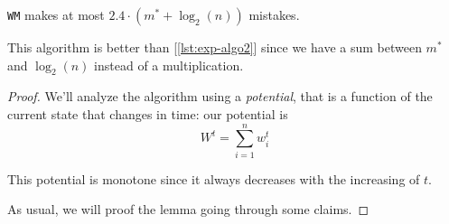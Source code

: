 \begin{lem}\label{lem:exp-lm-errors}
    \texttt{WM} makes at most $2.4 \cdot(m^* + \log_2(n))$ mistakes.
\end{lem}

\obs This algorithm is better than [\ref{lst:exp-algo2}] since we have a sum between $m^*$ and $\log_2(n)$ instead of a multiplication.

\begin{proof}
    We'll analyze the algorithm using a \textit{potential}, that is a function of the current state that changes in time: our potential is
    \begin{equation}\label{eq:exp-wm-potential}
        W^t = \sum_{i=1}^{n} w_i^t
    \end{equation}
    
    \obs This potential is monotone since it always decreases with the increasing of $t$.
    
    As usual, we will proof the lemma going through some claims.
\end{proof}






